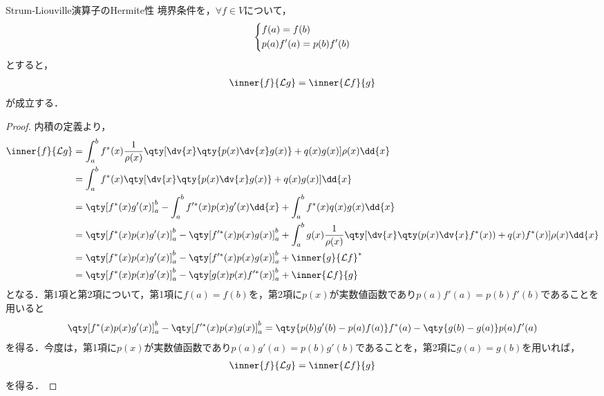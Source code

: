 \documentclass{report}
\begin{document}
      \begin{myprop}{Strum-Liouville演算子のHermite性}{}
        境界条件を，$\forall f \in V$について，
        \begin{align}
          \begin{dcases}
            f(a) = f(b) \\ 
            p(a)f'(a) = p(b)f'(b)
          \end{dcases}
        \end{align}
        とすると，
        \begin{align}
          \inner{f}{\mathcal{L}g} = \inner{\mathcal{L}f}{g}\label{hermite-def}
        \end{align}
        が成立する．
        \tcblower
        \begin{proof}
          内積の定義より，
          \begin{align}
            \inner{f}{\mathcal{L}g} &= \int_{a}^{b} f^*(x)\frac{1}{\rho(x)}\qty[\dv{x}\qty{p(x)\dv{x}g(x)} + q(x)g(x)]\rho(x)\dd{x} \\ 
            &= \int_{a}^{b} f^*(x)\qty[\dv{x}\qty{p(x)\dv{x}g(x)} + q(x)g(x)]\dd{x} \\ 
            &= \qty[f^*(x)g'(x)]_{a}^{b} - \int_{a}^{b}f'^*(x)p(x)g'(x)\dd{x} + \int_{a}^{b}f^*(x)q(x)g(x)\dd{x} \\ 
            &= \qty[f^*(x)p(x)g'(x)]_{a}^{b} - \qty[f'^*(x)p(x)g(x)]_{a}^{b} + \int_{a}^{b}g(x)\frac{1}{\rho(x)}\qty[\dv{x}\qty(p(x)\dv{x}f^*(x)) + q(x)f^*(x)]\rho(x)\dd{x} \\ 
            &= \qty[f^*(x)p(x)g'(x)]_{a}^{b} - \qty[f'^*(x)p(x)g(x)]_{a}^{b} + \inner{g}{\mathcal{L}f}^* \\ 
            &= \qty[f^*(x)p(x)g'(x)]_{a}^{b} - \qty[g(x)p(x)f'^*(x)]_{a}^{b} + \inner{\mathcal{L}f}{g} 
          \end{align}
          となる．第1項と第2項について，第1項に$f(a) = f(b)$を，第2項に$p(x)$が実数値函数であり$p(a)f'(a) = p(b)f'(b)$であることを用いると
          \begin{align}
            \qty[f^*(x)p(x)g'(x)]_{a}^{b} - \qty[f'^*(x)p(x)g(x)]_{a}^{b} = \qty{p(b)g'(b) - p(a)f(a)}f^*(a) - \qty{g(b) - g(a)}p(a)f'(a)
          \end{align}
          を得る．今度は，第1項に$p(x)$が実数値函数であり$p(a)g'(a) = p(b)g'(b)$であることを，第2項に$g(a) = g(b)$を用いれば，
          \begin{align}
            \inner{f}{\mathcal{L}g} = \inner{\mathcal{L}f}{g}
          \end{align}
          を得る．
        \end{proof}
      \end{myprop}
\end{document}
